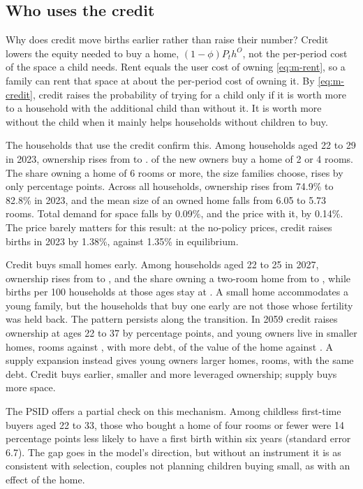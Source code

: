 \subsection{Who uses the credit}
\label{sec:policy-credit}

Why does credit move births earlier rather than raise their number? Credit
lowers the equity needed to buy a home, $(1-\phi)P_th^O$, not the per-period
cost of the space a child needs. Rent equals the user cost of owning
\eqref{eq:m-rent}, so a family can rent that space at about the per-period
cost of owning it. By \eqref{eq:m-credit}, credit raises the probability of
trying for a child only if it is worth more to a household with the additional
child than without it. It is worth more without the child when it mainly helps
households without children to buy.

The households that use the credit confirm this. Among households aged 22 to
29 in 2023, ownership rises from  to .  of the
new owners buy a home of 2 or 4 rooms. The share owning a home of 6 rooms or
more, the size families choose, rises by only  percentage points.
Across all households, ownership rises from 74.9\% to 82.8\% in 2023, and the
mean size of an owned home falls from 6.05 to 5.73 rooms. Total demand for
space falls by 0.09\%, and the price with it, by 0.14\%. The price barely
matters for this result: at the no-policy prices, credit raises births in
2023 by 1.38\%, against 1.35\% in equilibrium.

Credit buys small homes early. Among households aged 22 to 25 in 2027,
ownership rises from  to , and the share owning a
two-room home from  to , while births per 100 households
at those ages stay at . A small home accommodates a young family,
but the households that buy one early are not those whose fertility was held
back. The pattern persists along the transition. In 2059 credit raises
ownership at ages 22 to 37 by  percentage points, and young owners
live in smaller homes,  rooms against , with more debt,
 of the value of the home against . A supply expansion
instead gives young owners larger homes,  rooms, with the same debt.
Credit buys earlier, smaller and more leveraged ownership; supply buys more
space.

The PSID offers a partial check on this mechanism. Among childless first-time
buyers aged 22 to 33, those who bought a home of four rooms or fewer were 14
percentage points less likely to have a first birth within six years
(standard error 6.7). The gap goes in the model's direction, but without an
instrument it is as consistent with selection, couples not planning children
buying small, as with an effect of the home.

